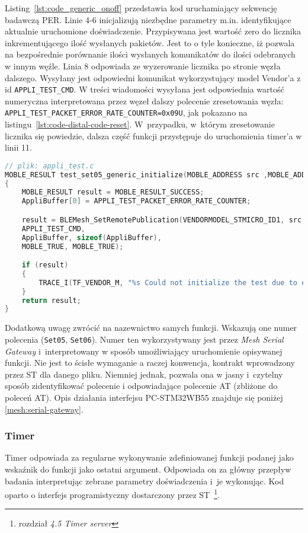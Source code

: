 Listing~\ref{lst:code_generic_onoff} przedstawia kod uruchamiający sekwencję badawczą PER. Linie 4-6 inicjalizują niezbędne
parametry m.in. identyfikujące aktualnie uruchomione doświadczenie. Przypisywana jest wartość zero do licznika inkrementującego
ilość wysłanych pakietów. Jest to o tyle  konieczne, iż pozwala na bezpośrednie porównanie ilości wysłanych komunikatów do
ilości odebranych w innym węźle. Linia 8 odpowiada ze wyzerowanie licznika po stronie węzła dalszego. Wysyłany jest odpowiedni
komunikat wykorzystujący model Vendor'a z id \texttt{APPLI\_TEST\_CMD}. W treści wiadomości wysyłana jest odpowiednia wartość numeryczna
interpretowana przez węzeł dalszy polecenie zresetowania węzła: \texttt{APPLI\_TEST\_PACKET\_ERROR\_RATE\_COUNTER=0x09U}, jak
pokazano na listingu~\ref{lst:code-distal-code-reset}.
W~przypadku, w~którym zresetowanie licznika się powiedzie, dalsza część funkcji przystępuje do uruchomienia timer'a
w linii 11.

\begin{lstlisting}[language=C,
    caption={Kod resetujący wartość licznika w węźle dystalnym},
    label={lst:code-distal-code-reset}]
// plik: appli_test.c
MOBLE_RESULT test_set05_generic_initialize(MOBLE_ADDRESS src ,MOBLE_ADDRESS dst)
{
	MOBLE_RESULT result = MOBLE_RESULT_SUCCESS;
	AppliBuffer[0] = APPLI_TEST_PACKET_ERROR_RATE_COUNTER;

	result = BLEMesh_SetRemotePublication(VENDORMODEL_STMICRO_ID1, src,
	APPLI_TEST_CMD,
	AppliBuffer, sizeof(AppliBuffer),
	MOBLE_TRUE, MOBLE_TRUE);

	if (result)
	{
		TRACE_I(TF_VENDOR_M, "%s Could not initialize the test due to error code=%d \r\n", OP_NAME_SET05, result);
	}
	return result;
}
\end{lstlisting}

Dodatkową uwagę zwrócić na nazewnictwo samych funkcji. Wskazują one numer polecenia (\texttt{Set05}, \texttt{Set06}). Numer ten wykorzystywany
jest przez \textit{Mesh Serial Gateway} i~interpretowany w sposób umożliwiający uruchomienie opisywanej funkcji. 
Nie jest to ścisłe wymaganie a raczej konwencja, kontrakt wprowadzony przez ST dla danego pliku. Niemniej jednak, pozwala
ona w jasny i~czytelny sposób zidentyfikować polecenie i odpowiadające polecenie \gls{AT} (zbliżone do poleceń AT). Opis
działania interfejsu PC-STM32WB55 znajduje się poniżej \ref{mesh:serial-gateway}.

\subsubsection{Timer}\label{sec:timer}
Timer odpowiada za regularne wykonywanie zdefiniowanej funkcji podanej jako wskaźnik do funkcji jako ostatni argument. Odpowiada
on za główny przepływ badania interpretując zebrane parametry doświadczenia i~je wykonując. Kod oparto o interfejs programistyczny
dostarczony przez ST~\cite{stmicroelectronics_an5289_2021}\footnote{rozdział \textit{4.5 Timer server}}.

